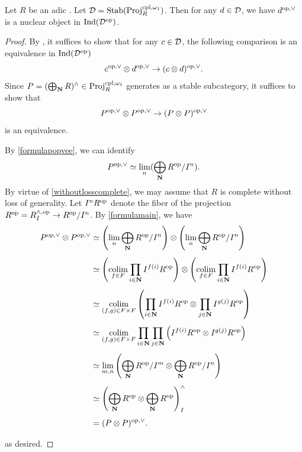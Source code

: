 \documentclass[a4paper,10pt, oneside]{amsart}
\begin{document}
\begin{prop}\label{popveenuclear}
	Let $R$ be an adic \einfring. Let  $\mathcal{D}=\mathrm{Stab}(\mathrm{Proj}_R^{\mathrm{cpl},\omega_1})$. Then for any $d\in \mathcal{D}$, we have $d^{\mathrm{op},\vee}$ is a nuclear object in $\mathrm{Ind}(\mathcal{D}^{\mathrm{op}})$.
\end{prop}
\begin{proof}
By \cite[Proposition 1.33]{efimov2025localizinginvariantsinverselimits}, it suffices to show that for any $c\in \mathcal{D}$, the following comparison is an equivalence in $\mathrm{Ind}(\mathcal{D}^{\mathrm{op}})$
$$
c^{\mathrm{op},\vee}\otimes d^{\mathrm{op},\vee}\to (c\otimes d)^{\mathrm{op},\vee} .
$$
Since $P=(\bigoplus_{\mathbf{N}} R)^{\wedge}\in \mathrm{Proj}_R^{\mathrm{cpl},\omega_1}$ generates \mcd as a stable subcategory, it suffices to show that  $$
P^{\mathrm{op},\vee}\otimes P^{\mathrm{op},\vee}\to (P\otimes P)^{\mathrm{op},\vee} 
$$ is an equivalence. 

By \cref{formulapopvee}, we can identify $$P^{\mathrm{op},\vee}\simeq \lim_n (\bigoplus_{\mathbf{N}} R^{\mathrm{op}}/I^n).$$ By virtue of \cref{withoutlosscomplete}, we may assume that $R$ is complete without loss of generality. Let $I^nR^{\mathrm{op}}$ denote the fiber of the projection $R^{\mathrm{op}}=R^{\wedge,\mathrm{op}}_I\to R^{\mathrm{op}}/I^n$. By \cref{formulamain}, we have
\[
\begin{aligned}
	P^{\mathrm{op},\vee}\otimes P^{\mathrm{op},\vee}
	&\simeq 
	\left(\lim_n \bigoplus_{\mathbf{N}} R^{\mathrm{op}}/I^n\right)
	\otimes
	\left(\lim_n \bigoplus_{\mathbf{N}} R^{\mathrm{op}}/I^n\right) \\[4pt]
	&\simeq
	\left(
	\operatorname*{colim}_{f\in F}
	\prod_{i\in \mathbf{N}} I^{f(i)}R^{\mathrm{op}}
	\right)
	\otimes
	\left(
	\operatorname*{colim}_{f\in F}
	\prod_{i\in \mathbf{N}} I^{f(i)}R^{\mathrm{op}}
	\right) \\[4pt]
	&\simeq
	\operatorname*{colim}_{(f,g)\in F\times F}
	\left(
	\prod_{i\in \mathbf{N}} I^{f(i)}R^{\mathrm{op}}
	\otimes
	\prod_{j\in \mathbf{N}} I^{g(j)}R^{\mathrm{op}}
	\right) \\[4pt]
	&\simeq
	\operatorname*{colim}_{(f,g)\in F\times F}
	\prod_{i\in \mathbf{N}}
	\prod_{j\in \mathbf{N}}
	\left(
	I^{f(i)}R^{\mathrm{op}}\otimes I^{g(j)}R^{\mathrm{op}}
	\right) \\[4pt]
	&\simeq
	\lim_{m,n}
	\left(
	\bigoplus_{\mathbf{N}} R^{\mathrm{op}}/I^m
	\otimes
	\bigoplus_{\mathbf{N}} R^{\mathrm{op}}/I^n
	\right) \\[4pt]
	&\simeq
	\left(
	\bigoplus_{\mathbf{N}} R^{\mathrm{op}}
	\otimes
	\bigoplus_{\mathbf{N}} R^{\mathrm{op}}
	\right)^\wedge_I
	\\[4pt]
	&=(P\otimes P)^{\mathrm{op},\vee} .
\end{aligned}
\]

as desired.
\end{proof}
\end{document}
